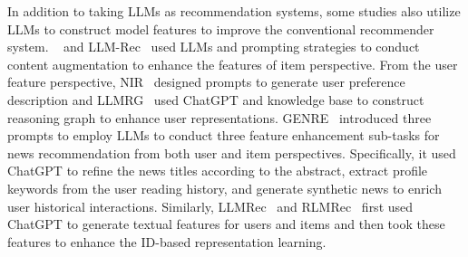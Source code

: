 \documentclass[sn-mathphys-num]{sn-jnl}%
\theoremstyle{thmstyleone}%
\theoremstyle{thmstyletwo}%
\theoremstyle{thmstylethree}%
\begin{document}
In addition to taking LLMs as recommendation systems, some studies also utilize LLMs to construct model features to improve the conventional recommender system.
~\cite{DBLP:conf/recsys/AcharyaSO23,DBLP:journals/corr/abs-2403-03424,DBLP:journals/corr/abs-2403-18348} and LLM-Rec~\cite{DBLP:journals/corr/abs-2307-15780} used LLMs and prompting strategies to conduct content augmentation to enhance the features of item perspective.
From the user feature perspective, NIR~\cite{DBLP:journals/corr/abs-2304-03153} designed prompts to generate user preference description and LLMRG~\cite{DBLP:journals/corr/abs-2308-10835} used ChatGPT and knowledge base to construct reasoning graph to enhance user representations.
GENRE~\cite{DBLP:journals/corr/abs-2305-06566} introduced three prompts to employ LLMs to conduct three feature enhancement sub-tasks for news recommendation from both user and item perspectives.
Specifically, it used ChatGPT to refine the news titles according to the abstract, extract profile keywords from the user reading history, and generate synthetic news to enrich user historical interactions.
Similarly, LLMRec~\cite{DBLP:journals/corr/abs-2311-00423} and RLMRec~\cite{DBLP:journals/corr/abs-2310-15950} first used ChatGPT to generate textual features for users and items and then took these features to enhance the ID-based representation learning.
\end{document}
